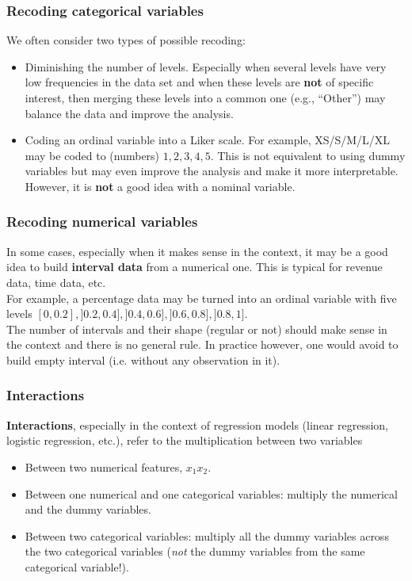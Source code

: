 \begin{frame}
\frametitle{Recoding categorical variables}
We often consider two types of possible recoding:
\begin{itemize}
\item Diminishing the number of levels. Especially when several levels have very low frequencies in the data set and when these levels are {\bf not} of specific interest, then merging these levels into a common one (e.g., ``Other'') may balance the data and improve the analysis.
\item Coding an ordinal variable into a Liker scale. For example, XS/S/M/L/XL may be coded to (numbers) $1, 2, 3, 4, 5$. This is not equivalent to using dummy variables but may even improve the analysis and make it more interpretable. However, it is {\bf not} a good idea with a nominal variable.
\end{itemize}
\end{frame}
\begin{frame}
\frametitle{Recoding numerical variables}
In some cases, especially when it makes sense in the context, it may be a good idea to build {\bf interval data} from a numerical one. This is typical for revenue data, time data, etc.\\
\vspace{0.3cm}
For example, a percentage data may be turned into an ordinal variable with five levels $[0,0.2], ]0.2,0.4], ]0.4,0.6], ]0.6,0.8], ]0.8,1]$. \\
\vspace{0.3cm}
The number of intervals and their shape (regular or not) should make sense in the context and there is no general rule. In practice however, one would avoid to build empty interval (i.e. without any observation in it).
\end{frame}
\begin{frame}
\frametitle{Interactions}
{\bf Interactions}, especially in the context of regression models (linear regression, logistic regression, etc.), refer to the multiplication between two variables
\begin{itemize}
\item Between two numerical features, $x_1x_2$.
\item Between one numerical and one categorical variables: multiply the numerical and the dummy variables.
\item Between two categorical variables: multiply all the dummy variables across the two categorical variables ({\it not} the dummy variables from the same categorical variable!).
\end{itemize}
\end{frame}
